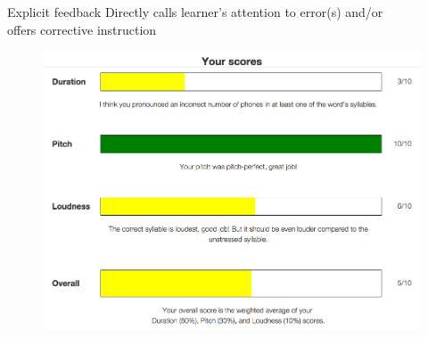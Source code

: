 \documentclass[xcolor={dvipsnames}]{beamer}
\begin{document}
		\begin{frame}{Explicit feedback}
		Directly calls learner's attention to error(s) and/or \\offers corrective instruction
		
		\begin{figure}
		\includegraphics[height=.8\textheight]{SkillBarsWithMessages}
		\end{figure}
		\end{frame}
		
		
	
\end{document}

